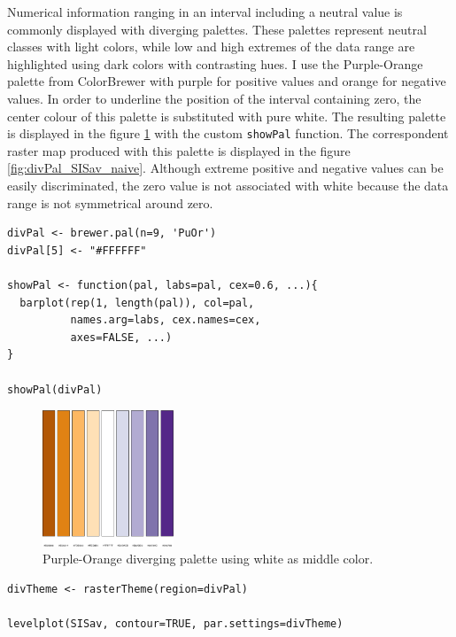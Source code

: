 Numerical information ranging in an interval including a neutral
value is commonly displayed with diverging palettes. These
palettes represent neutral classes with light colors, while low
and high extremes of the data range are highlighted using dark
colors with contrasting hues. I use the Purple-Orange palette from
ColorBrewer with purple for positive values and orange for
negative values. In order to underline the position of the
interval containing zero, the center colour of this palette is
substituted with pure white. The resulting palette is displayed in
the figure \ref{fig:showDivPal} with the custom \texttt{showPal}
function. The correspondent raster map produced with this palette
is displayed in the figure \ref{fig:divPal_SISav_naive}.  Although
extreme positive and negative values can be easily discriminated,
the zero value is not associated with white because the data range
is not symmetrical around zero.


\lstset{language=R}
\begin{lstlisting}
divPal <- brewer.pal(n=9, 'PuOr')
divPal[5] <- "#FFFFFF"

showPal <- function(pal, labs=pal, cex=0.6, ...){
  barplot(rep(1, length(pal)), col=pal,
          names.arg=labs, cex.names=cex,
          axes=FALSE, ...)
}

showPal(divPal)
\end{lstlisting}

\begin{figure}[h!]
\centering
\includegraphics[width=0.35\textwidth]{figs/showDivPal.pdf}
\caption{\label{fig:showDivPal}Purple-Orange diverging palette using white as middle color.}
\end{figure}



\lstset{language=R}
\begin{lstlisting}
divTheme <- rasterTheme(region=divPal)

levelplot(SISav, contour=TRUE, par.settings=divTheme)
\end{lstlisting}

